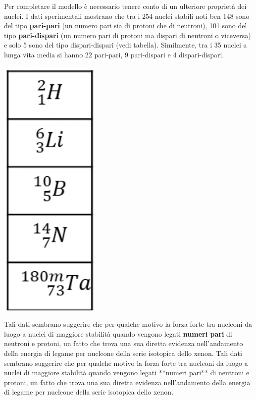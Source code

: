 Per completare il modello è necessario tenere conto di un ulteriore
proprietà dei nuclei.
I dati sperimentali mostrano che tra i 254 nuclei
stabili noti ben 148 sono del tipo \textbf{pari-pari} (un numero pari
sia di protoni che di neutroni), 101 sono del tipo \textbf{pari-dispari}
(un numero pari di protoni ma dispari di neutroni o viceversa) e solo 5
sono del tipo dispari-dispari (vedi tabella).
Similmente, tra i 35
nuclei a lunga vita media si hanno 22 pari-pari, 9 pari-dispari e 4
dispari-dispari.
\begin{marginfigure}
    \centering
    \includegraphics[height = 0.35 \textheight]{figs/goccia4}
    \label{fig:goccia4}
\end{marginfigure}
Tali dati sembrano suggerire che per qualche motivo la forza forte tra
nucleoni da luogo a nuclei di maggiore stabilità quando vengono legati
\textbf{numeri pari} di neutroni e protoni, un fatto che trova una sua
diretta evidenza nell'andamento della energia di legame per nucleone
della serie isotopica dello xenon.
Tali dati sembrano suggerire che per qualche motivo la forza forte tra nucleoni da luogo a nuclei di maggiore stabilità quando vengono legati **numeri pari** di neutroni e protoni, un fatto che trova una sua diretta evidenza nell’andamento della energia di legame per nucleone della serie isotopica dello xenon.

